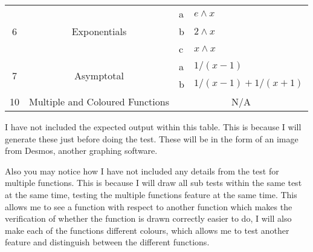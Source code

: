 \documentclass[../../../../main.tex]{subfiles}
\begin{document}
\begin{table}[H]
\begin{tabular}{|c|c|l|l|}
\multirow{3}{*}{6} & \multirow{3}{*}{Exponentials}                              & a                                    & $e\wedge x$               \\ \cline{3-4} 
                   &                                                            & b                                    & $2\wedge x$               \\ \cline{3-4} 
                   &                                                            & c                                    & $x\wedge x$               \\ \hline
\multirow{2}{*}{7} & \multirow{2}{*}{Asymptotal}                                & a                                    & $1/(x-1)$           \\ \cline{3-4} 
                   &                                                            & b                                    & $1/(x-1) + 1/(x+1)$ \\ \hline
10                 & Multiple and Coloured Functions                            & \multicolumn{2}{c|}{N/A}                                   \\ \hline
\end{tabular}
\end{table}

I have not included the expected output within this table. This is because I will generate these just before doing the test. These will be in the form of an image from Desmos, another graphing software.


Also you may notice how I have not included any details from the test for multiple functions. This is because I will draw all sub tests within the same test at the same time, testing the multiple functions feature at the same time. This allows me to see a function with respect to another function which makes the verification of whether the function is drawn correctly easier to do, I will also make each of the functions different colours, which allows me to test another feature and distinguish between the different functions.
\newpage
\end{document}
